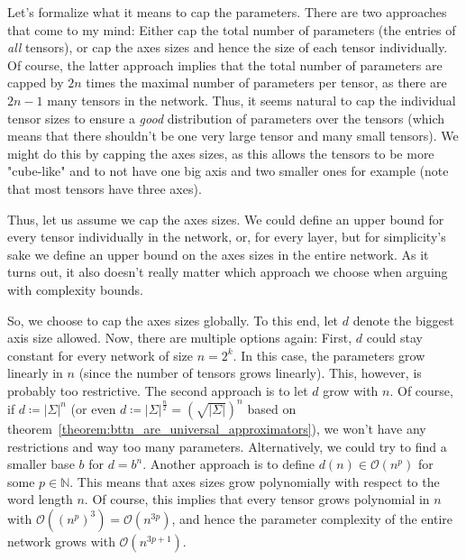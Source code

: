 \documentclass[../../main.tex]{subfiles}
\begin{document}

    Let's formalize what it means to cap the parameters. There are two approaches that come to my mind: Either cap the total number of parameters (the entries of \emph{all} tensors), or cap the axes sizes and hence the size of each tensor individually. Of course, the latter approach implies that the total number of parameters are capped by $2n$ times the maximal number of parameters per tensor, as there are $2n-1$ many tensors in the network. Thus, it seems natural to cap the individual tensor sizes to ensure a \emph{good} distribution of parameters over the tensors (which means that there shouldn't be one very large tensor and many small tensors). We might do this by capping the axes sizes, as this allows the tensors to be more "cube-like" and to not have one big axis and two smaller ones for example (note that most tensors have three axes).

    Thus, let us assume we cap the axes sizes. We could define an upper bound for every tensor individually in the network, or, for every layer, but for simplicity's sake we define an upper bound on the axes sizes in the entire network. As it turns out, it also doesn't really matter which approach we choose when arguing with complexity bounds.

    So, we choose to cap the axes sizes globally. To this end, let $d$ denote the biggest axis size allowed. Now, there are multiple options again: First, $d$ could stay constant for every network of size $n = 2^k$. In this case, the parameters grow linearly in $n$ (since the number of tensors grows linearly). This, however, is probably too restrictive. The second approach is to let $d$ grow with $n$. Of course, if $d \coloneqq |\Sigma|^n$ (or even $d \coloneqq |\Sigma|^{\frac{n}{2}} = \left(\sqrt{|\Sigma|}\right)^n$ based on theorem~\ref{theorem:bttn_are_universal_approximators}), we won't have any restrictions and way too many parameters. Alternatively, we could try to find a smaller base $b$ for $d = b^n$. Another approach is to define $d(n) \in \mathcal{O}(n^p)$ for some $p \in \mathbb{N}$. This means that axes sizes grow polynomially with respect to the word length $n$. Of course, this implies that every tensor grows polynomial in $n$ with $\mathcal{O}((n^p)^3) = \mathcal{O}(n^{3p})$, and hence the parameter complexity of the entire network grows with $\mathcal{O}(n^{3p+1})$.
\end{document}
